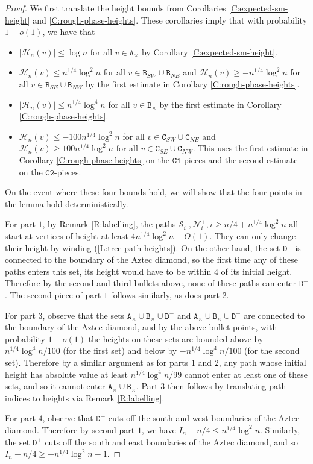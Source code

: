 \documentclass[11pt,twoside]{amsart}
\theoremstyle{plain}
\numberwithin{quest}{section}
\theoremstyle{remark}
\numberwithin{rem}{section}
\theoremstyle{definition}
\newcommand{\cS}{\mathcal{S}}
\newcommand{\cN}{\mathcal{N}}
\newcommand{\cH}{\mathcal{H}}
\renewcommand{\tt}[1]{{\mathtt{#1}}}
\begin{document}
	\begin{proof}
		We first translate the height bounds from Corollaries \ref{C:expected-sm-height} and \ref{C:rough-phase-heights}. These corollaries imply that with probability $1- o(1)$, we have that
		\begin{itemize}[nosep]
			\item $|\cH_n(v)| \le \log n$ for all $v \in \tt{A}_\times$ by Corollary \ref{C:expected-sm-height}.
			\item $\cH_n(v) \le n^{1/4} \log^2 n$ for all $v \in \tt{B}_{SW} \cup \tt{B}_{NE}$ and $\cH_n(v) \ge -n^{1/4} \log^2 n$ for all $v \in \tt{B}_{SE} \cup \tt{B}_{NW}$ by the first estimate in Corollary \ref{C:rough-phase-heights}.
			\item $|\cH_n(v)| \le n^{1/4} \log^4 n$ for all $v \in \tt{B}_\times$ by the first estimate in Corollary \ref{C:rough-phase-heights}.
			\item $\cH_n(v) \le - 100 n^{1/4} \log^2 n$ for all $v \in \tt{C}_{SW} \cup \tt{C}_{NE}$ and $\cH_n(v) \ge 100 n^{1/4} \log^2 n$ for all $v \in \tt{C}_{SE} \cup \tt{C}_{NW}$.  This uses the first estimate in Corollary \ref{C:rough-phase-heights} on the $\tt{C1}$-pieces and the second estimate on the $\tt{C2}$-pieces.
		\end{itemize}
		On the event where these four bounds hold, we will show that the four points in the lemma hold deterministically.
		
		For part $1$, by Remark \ref{R:labelling}, the paths $\cS_i^\pm, \cN_i^\pm, i \ge n/4 + n^{1/4} \log^2 n$ all start at vertices of height at least $4 n^{1/4} \log^2 n + O(1)$. They can only change their height by winding (\cref{L:tree-path-heights}). On the other hand, the set $\tt{D}^-$ is connected to the boundary of the Aztec diamond, so the first time any of these paths enters this set, its height would have to be within $4$ of its initial height. Therefore by the second and third bullets above, none of these paths can enter $\tt{D}^-$. The second piece of part $1$ follows similarly, as does part $2$.
		
		For part $3$, observe that the sets $\tt{A}_\times \cup \tt{B}_\times \cup \tt{D}^-$ and $\tt{A}_\times \cup \tt{B}_\times \cup \tt{D}^+$ are connected to the boundary of the Aztec diamond, and by the above bullet points, with probability $1- o(1)$ the heights on these sets are bounded above by $n^{1/4} \log^4 n/100$ (for the first set) and below by $-n^{1/4} \log^4 n/100$ (for the second set). Therefore by a similar argument as for parts $1$ and $2$, any path whose initial height has absolute value at least $n^{1/4} \log^4 n/99$ cannot enter at least one of these sets, and so it cannot enter $\tt{A}_\times \cup \tt{B}_\times$. Part $3$ then follows by translating path indices to heights via Remark \ref{R:labelling}.
		
		For part $4$, observe that $\tt{D}^-$ cuts off the south and west boundaries of the Aztec diamond. Therefore by second part $1$, we have $I_n - n/4 \le n^{1/4} \log^2 n$. Similarly, the set $\tt{D}^+$ cuts off the south and east boundaries of the Aztec diamond, and so $I_n - n/4 \ge -n^{1/4} \log^2 n - 1$.
	\end{proof}
	
\end{document}
